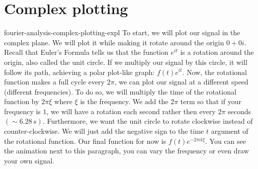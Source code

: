 \documentclass[preview]{standalone}
\begin{document}
\genpage

\section{Complex plotting}

\begin{snippet}{fourier-analysis-complex-plotting-expl}
    To start, we will plot our signal in the complex plane.
    We will plot it while making it rotate around the origin \(0+0i\).
    Recall that Euler's Formula tells us that the function \(e^{it}\) is a rotation
    around the origin, also called the unit circle. If we multiply our signal by this circle,
    it will follow its path, achieving a polar plot-like graph: \(f(t)e^{it}\).
    Now, the rotational function makes a full cycle every \(2\pi\), we can plot our
    signal at a different speed (different frequencies). To do so, we will multiply
    the time of the rotational function by \(2\pi \xi\) where \(\xi\) is the frequency.
    We add the \(2\pi\) term so that if your frequency is \(1\), we will have a rotation each second
    rather then every \(2\pi\) seconds \((\sim 6.28\,s)\).
    Furthermore, we want the unit circle to rotate clockwise instead of counter-clockwise.
    We will just add the negative sign to the time \(t\) argument of the rotational function.
    Our final function for now is \(f(t)e^{-2\pi it\xi}\). You can see the animation next
    to this paragraph, you can vary the frequency or even draw your own signal.
\end{snippet}

\end{document}
